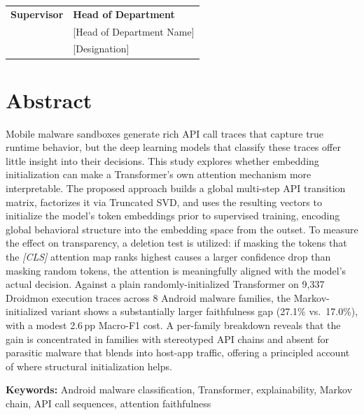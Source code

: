 \documentclass[12pt]{report}
\newcommand{\supervisor}{[Supervisor Name]}
\newcommand{\supervisordesignation}{[Designation]}
\newcommand{\hod}{[Head of Department Name]}
\newcommand{\hoddesignation}{[Designation]}
\begin{document}
\vspace{1cm}
\noindent
\begin{tabular}{p{}p{}}
\textbf{Supervisor} & \textbf{Head of Department} \\
\supervisor & \hod \\
\supervisordesignation & \hoddesignation \\
\end{tabular}

\chapter*{Abstract}

Mobile malware sandboxes generate rich API call traces that capture true
runtime behavior, but the deep learning models that classify these traces
offer little insight into their decisions.
This study explores whether embedding initialization can make a Transformer's own
attention mechanism more interpretable.
The proposed approach builds a global multi-step API transition matrix,
factorizes it via Truncated SVD, and uses the resulting vectors to
initialize the model's token embeddings prior to supervised training,
encoding global behavioral structure into the embedding space from the
outset.
To measure the effect on transparency, a deletion test is utilized: if masking
the tokens that the \textit{[CLS]} attention map ranks highest causes a
larger confidence drop than masking random tokens, the attention is
meaningfully aligned with the model's actual decision.
Against a plain randomly-initialized Transformer on 9,337 Droidmon
execution traces across 8 Android malware families, the Markov-initialized
variant shows a substantially larger faithfulness gap (27.1\% vs.\ 17.0\%),
with a modest 2.6\,pp Macro-F1 cost.
A per-family breakdown reveals that the gain is concentrated in families
with stereotyped API chains and absent for parasitic malware that blends
into host-app traffic, offering a principled account of where structural
initialization helps.

\textbf{Keywords:} Android malware classification, Transformer, explainability,
Markov chain, API call sequences, attention faithfulness

\end{document}
